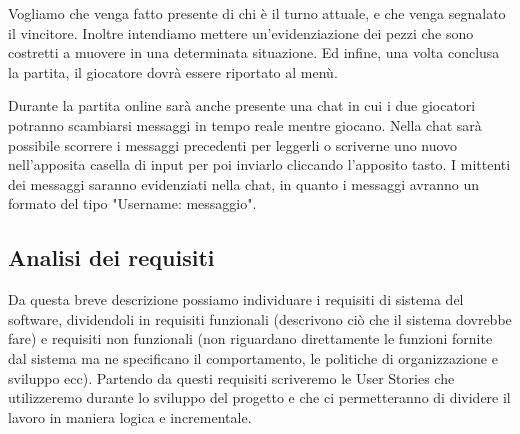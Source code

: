 \documentclass[12pt]{article}
\begin{document}
Vogliamo che venga fatto presente di chi è il turno attuale, e che venga segnalato il vincitore. Inoltre intendiamo mettere un'evidenziazione dei pezzi che sono costretti a muovere in una determinata situazione. Ed infine, una volta conclusa la partita, il giocatore dovrà essere riportato al menù.

Durante la partita online sarà anche presente una chat in cui i due giocatori potranno scambiarsi messaggi in tempo reale mentre giocano. Nella chat sarà possibile scorrere i messaggi precedenti per leggerli o scriverne uno nuovo nell'apposita casella di input per poi inviarlo cliccando l'apposito tasto. I mittenti dei messaggi saranno evidenziati nella chat, in quanto i messaggi avranno un formato del tipo "Username: messaggio".

\subsection{Analisi dei requisiti}
Da questa breve descrizione possiamo individuare i requisiti di sistema del software, dividendoli in requisiti funzionali (descrivono ciò che il sistema dovrebbe fare) e requisiti non funzionali (non riguardano direttamente le funzioni fornite dal sistema ma ne specificano il comportamento, le politiche di organizzazione e sviluppo ecc). Partendo da questi requisiti scriveremo le User Stories che utilizzeremo durante lo sviluppo del progetto e che ci permetteranno di dividere il lavoro in maniera logica e incrementale.
\end{document}
